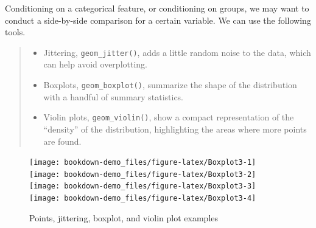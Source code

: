 \documentclass[]{book}
\newenvironment{Shaded}{\begin{snugshade}}{\end{snugshade}}
\newcommand{\KeywordTok}[1]{\textcolor[rgb]{0.13,0.29,0.53}{\textbf{#1}}}
\newcommand{\DataTypeTok}[1]{\textcolor[rgb]{0.13,0.29,0.53}{#1}}
\newcommand{\StringTok}[1]{\textcolor[rgb]{0.31,0.60,0.02}{#1}}
\newcommand{\OperatorTok}[1]{\textcolor[rgb]{0.81,0.36,0.00}{\textbf{#1}}}
\newcommand{\NormalTok}[1]{#1}
\providecommand{\tightlist}{%
  \setlength{\itemsep}{0pt}\setlength{\parskip}{0pt}}
\begin{document}
Conditioning on a categorical feature, or conditioning on groups, we may
want to conduct a side-by-side comparison for a certain variable. We can
use the following tools.

\begin{quote}
\begin{itemize}
\tightlist
\item
  Jittering, \texttt{geom\_jitter()}, adds a little random noise to the
  data, which can help avoid overplotting.
\item
  Boxplots, \texttt{geom\_boxplot()}, summarize the shape of the
  distribution with a handful of summary statistics.
\item
  Violin plots, \texttt{geom\_violin()}, show a compact representation
  of the ``density'' of the distribution, highlighting the areas where
  more points are found.
\end{itemize}
\end{quote}

\begin{Shaded}
\end{Shaded}

\begin{figure}
\texttt{[image: bookdown-demo\_files/figure-latex/Boxplot3-1]} \texttt{[image: bookdown-demo\_files/figure-latex/Boxplot3-2]} \texttt{[image: bookdown-demo\_files/figure-latex/Boxplot3-3]} \texttt{[image: bookdown-demo\_files/figure-latex/Boxplot3-4]} \caption{Points, jittering, boxplot, and violin plot examples}\label{fig:Boxplot3}
\end{figure}
\end{document}
